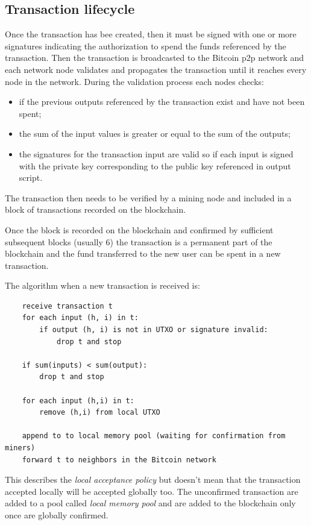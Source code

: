\subsection{Transaction lifecycle}
Once the transaction has bee created, then it must be signed with one or more signatures indicating the authorization to spend the funds referenced by the transaction.
Then the transaction is broadcasted to the Bitcoin p2p network and each network node validates and propagates the transaction until it reaches every node in the network.
During the validation process each nodes checks:
\begin{itemize}
    \item if the previous outputs referenced by the transaction exist and have not been spent;
    \item the sum of the input values is greater or equal to the sum of the outputs;
    \item the signatures for the transaction input are valid so if each input is signed with the private key corresponding to the public key referenced in output script.
\end{itemize}
The transaction then needs to be verified by a mining node and included in a block of transactions recorded on the blockchain.

Once the block is recorded on the blockchain and confirmed by sufficient subsequent blocks (usually 6) the transaction is a permanent part of the blockchain and the fund transferred to the new user can be spent in a new transaction.

The algorithm when a new transaction is received is:
\begin{verbatim}
    receive transaction t
    for each input (h, i) in t:
        if output (h, i) is not in UTXO or signature invalid:
            drop t and stop

    if sum(inputs) < sum(output):
        drop t and stop

    for each input (h,i) in t:
        remove (h,i) from local UTXO

    append to to local memory pool (waiting for confirmation from miners)
    forward t to neighbors in the Bitcoin network
\end{verbatim}
This describes the \emph{local acceptance policy} but doesn't mean that the transaction accepted locally will be accepted globally too.
The unconfirmed transaction are added to a pool called \emph{local memory pool} and are added to the blockchain only once are globally confirmed.

